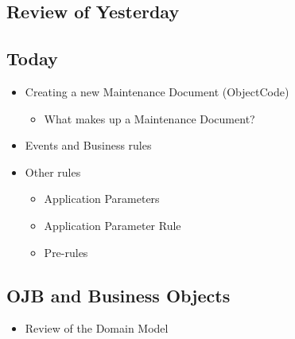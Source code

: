 \documentclass[12pt,notitlepage]{article}
\author{Warner Onstine and Leo Przybylski}
\subtitle{Day 2}
\affiliation{University of Arizona}
\begin{document}
  \W \begin{s5presentation}
  \maketitle
  \W \begin{s5slide}
      \W \section{Review of Yesterday}
      \begin{ifhtml}
          
      \end{ifhtml} 
  \W \end{s5slide}
  \W \begin{s5slide}
      \W \section{Today}
      \begin{ifhtml}
          \begin{itemize}
              \item Creating a new Maintenance Document (ObjectCode)
              \begin{itemize}
                  \item What makes up a Maintenance Document?
              \end{itemize}
              \item Events and Business rules
              \item Other rules
              \begin{itemize}
                  \item Application Parameters
                  \item Application Parameter Rule
                  \item Pre-rules
              \end{itemize}
          \end{itemize}
      \end{ifhtml} 
  \W \end{s5slide}
  \W \begin{s5slide}
      \W \section{OJB and Business Objects}
      \begin{ifhtml}
          \begin{itemize}
              \item Review of the Domain Model

\end{itemize}
\end{ifhtml}
\end{s5slide}
\end{s5presentation}
\end{document}
